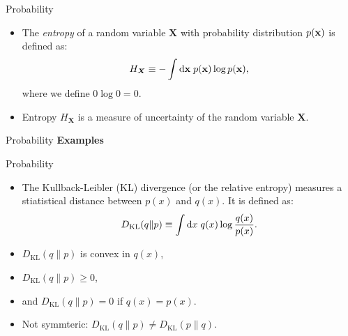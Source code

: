 \documentclass[10pt]{beamer}
\begin{document}
\begin{frame}{Probability}
\begin{itemize}
\setlength\itemsep{1em}
  \item The \textit{entropy} of a random variable $\boldsymbol{X}$ with probability distribution $p({\bf x})$ is defined as:
  \begin{equation}
    H_{\boldsymbol{X}} \equiv - \int\mathrm{d}{\bf x}\; p({\bf x})\log p({\bf x}),
  \end{equation}
  where we define $0\log 0=0$.

  \item Entropy $H_{\boldsymbol{X}}$ is a measure of uncertainty of the random variable $\boldsymbol{X}$.
\end{itemize}
\end{frame}

\begin{frame}{Probability}
\textbf{Examples}\vspace{0.2cm}
%
\vspace{0.2cm}
%
\vspace{0.2cm}
\end{frame}

\begin{frame}{Probability}
\begin{itemize}
\setlength\itemsep{1em}
  \item The Kullback-Leibler (KL) divergence (or the relative entropy) measures a stiatistical distance between $p(x)$ and $q(x)$. It is defined as:
  \begin{equation}
    D_{\mathrm{KL}}(q\|p) \equiv \int\mathrm{d} x\; q(x)\log\frac{q(x)}{p(x)}.
  \end{equation}

  \item $D_{\mathrm{KL}}(q\|p)$ is convex in $q(x)$,

  \item $D_{\mathrm{KL}}(q\|p) \geq 0$,

  \item and $D_{\mathrm{KL}}(q\|p)=0$ if $q(x)=p(x)$.

  \item Not symmteric: $D_{\mathrm{KL}}(q\|p) \neq D_{\mathrm{KL}}(p\|q)$.
\end{itemize}
\end{frame}
\end{document}
